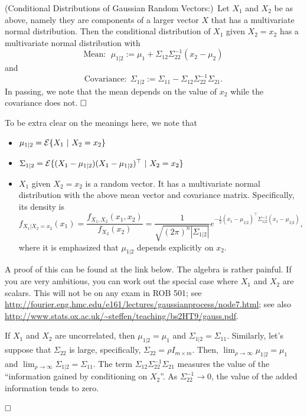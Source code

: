 \begin{keyfact} 
\label{keyfact1}
 (Conditional Distributions of Gaussian Random Vectors:)~Let $X_1$ and $X_2$ be as above, namely they are components of a larger vector $X$ that has a multivariate normal distribution. Then the conditional distribution of $X_1$ given $X_2 = x_2$ has a multivariate normal distribution with
$$\text{Mean}:~~ \mu_{1|2}:= \mu_1 + \Sigma_{12} \Sigma_{22}^{-1} (x_2 - \mu_2)$$
and
$$\text{Covariance:}~~ \Sigma_{1|2}:= \Sigma_{11}-\Sigma_{12} \Sigma_{22}^{-1}\Sigma_{21}.$$
In passing, we note that the mean depends on the value of $x_2$ while the covariance does not.
$\hfill \square$
\end{keyfact}
To be extra clear on the meanings here, we note that
\begin{itemize}
\setlength{\itemsep}{.4cm}
\item $ \mu_{1|2} = \mathcal{E}\{ X_1~|~X_2 = x_2\}$
\item $ \Sigma_{1|2} = \mathcal{E}\{ (X_1-\mu_{1|2}) (X_1-\mu_{1|2})^\top~| ~X_2=x_2 \} $
\item $X_1$ given $X_2=x_2$ is a random vector. It has a multivariate normal distribution with the above mean vector and covariance matrix. Specifically, its density is
    $$f_{X_1|X_2=x_2}(x_1) = \frac{f_{X_1,X_2}(x_1,x_2) }{f_{X_2}(x_2)} = \frac{1}{\sqrt{(2 \pi)^{n} |\Sigma_{1|2}| } } e^{ -\frac{1}{2} (x_1-\mu_{1|2})^\top \Sigma_{1|2}^{-1}(x_1-\mu_{1|2}) }, $$
    where it is emphasized that $\mu_{1|2}$ depends explicitly on $x_2$.
\end{itemize}
 A proof of this can be found at the link below. The algebra is rather painful. If you are very ambitious, you can work out the special case where $X_1$ and $X_2$ are scalars. This will not be on any exam in ROB 501; see \url{http://fourier.eng.hmc.edu/e161/lectures/gaussianprocess/node7.html}; see also
 \url{http://www.stats.ox.ac.uk/~steffen/teaching/bs2HT9/gauss.pdf}.

\begin{rem} If $X_1$ and $X_2$ are uncorrelated, then $\mu_{1|2}=\mu_1$ and $\Sigma_{1|2} = \Sigma_{11}$. Similarly, let's suppose that $\Sigma_{22}$ is large, specifically, $\Sigma_{22}=\rho I_{m \times m}$. Then,
$\lim_{\rho \to \infty} \mu_{1|2}=\mu_1$ and $\lim_{\rho \to \infty} \Sigma_{1|2} = \Sigma_{11}$. The term $\Sigma_{12} \Sigma_{22}^{-1}\Sigma_{21}$ measures the value of the ``information gained by conditioning on  $X_2$''. As $ \Sigma_{22}^{-1} \to 0$, the value of the added information tends to zero.

$\hfill \square$  \end{rem}

